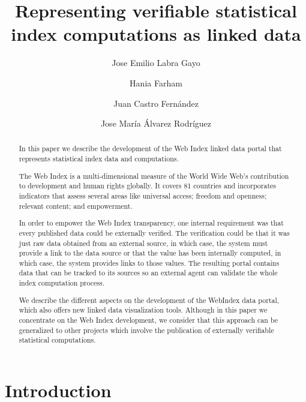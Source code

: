 \documentclass{llncs}
\begin{document}
\title{Representing verifiable statistical index computations as linked data}

\author{Jose Emilio Labra Gayo 
 \and Hania Farham
 \and Juan Castro Fernández
 \and Jose María Álvarez Rodríguez}
 

\maketitle
\begin{abstract}

In this paper we describe the development of the Web Index linked data portal that represents statistical index data and computations. 

The Web Index is a multi-dimensional measure of the World Wide Web’s contribution to development and human rights globally. It covers 81 countries and incorporates indicators that assess several areas like universal access; freedom and openness; relevant content; and empowerment.

In order to empower the Web Index transparency, one internal requirement was that every published data could be externally verified. 
The verification could be that it was just raw data obtained from an external source, in which case, the system must provide a link to the data source or that the value has been internally computed, 
 in which case, the system provides links to those values.
The resulting portal contains data that can be tracked to its sources so an external agent
can validate the whole index computation process.

We describe the different aspects on the development of the WebIndex data portal, which also offers new linked data visualization tools. Although in this paper we concentrate on the Web Index development, 
we consider that this approach can be generalized to other projects which involve 
 the publication of externally verifiable statistical computations.
\end{abstract}


\section{Introduction}
\end{document}
